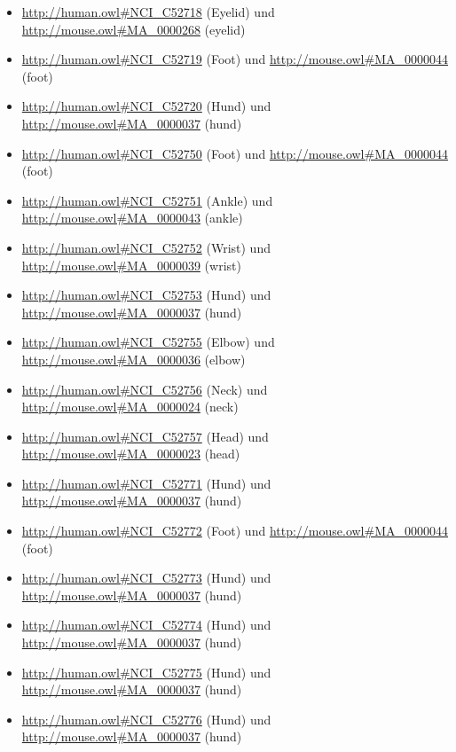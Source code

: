 \begin{itemize}
	\item \url{http://human.owl#NCI_C52718} (Eyelid\textunderscoreSkin) und \url{http://mouse.owl#MA_0000268} (eyelid)
	\item \url{http://human.owl#NCI_C52719} (Foot\textunderscoreDigit\textunderscoreSkin) und \url{http://mouse.owl#MA_0000044} (foot)
	\item \url{http://human.owl#NCI_C52720} (Hund\textunderscoreDigit\textunderscoreSkin) und \url{http://mouse.owl#MA_0000037} (hund)
	\item \url{http://human.owl#NCI_C52750} (Foot\textunderscoreSkin) und \url{http://mouse.owl#MA_0000044} (foot)
	\item \url{http://human.owl#NCI_C52751} (Ankle\textunderscoreSkin) und \url{http://mouse.owl#MA_0000043} (ankle)
	\item \url{http://human.owl#NCI_C52752} (Wrist\textunderscoreSkin) und \url{http://mouse.owl#MA_0000039} (wrist)
	\item \url{http://human.owl#NCI_C52753} (Hund\textunderscoreSkin) und \url{http://mouse.owl#MA_0000037} (hund)
	\item \url{http://human.owl#NCI_C52755} (Elbow\textunderscoreSkin) und \url{http://mouse.owl#MA_0000036} (elbow)
	\item \url{http://human.owl#NCI_C52756} (Neck\textunderscoreSkin) und \url{http://mouse.owl#MA_0000024} (neck)
	\item \url{http://human.owl#NCI_C52757} (Head\textunderscoreSkin) und \url{http://mouse.owl#MA_0000023} (head)
	\item \url{http://human.owl#NCI_C52771} (Hund\textunderscorePhalanx) und \url{http://mouse.owl#MA_0000037} (hund)
	\item \url{http://human.owl#NCI_C52772} (Foot\textunderscorePhalanx) und \url{http://mouse.owl#MA_0000044} (foot)
	\item \url{http://human.owl#NCI_C52773} (Hund\textunderscoreDigit{}\textunderscorePhalanx) und \url{http://mouse.owl#MA_0000037} (hund)
	\item \url{http://human.owl#NCI_C52774} (Hund\textunderscoreDigit{}\textunderscorePhalanx) und \url{http://mouse.owl#MA_0000037} (hund)
	\item \url{http://human.owl#NCI_C52775} (Hund\textunderscoreDigit{}\textunderscorePhalanx) und \url{http://mouse.owl#MA_0000037} (hund)
	\item \url{http://human.owl#NCI_C52776} (Hund\textunderscoreDigit{}\textunderscorePhalanx) und \url{http://mouse.owl#MA_0000037} (hund)

\end{itemize}

